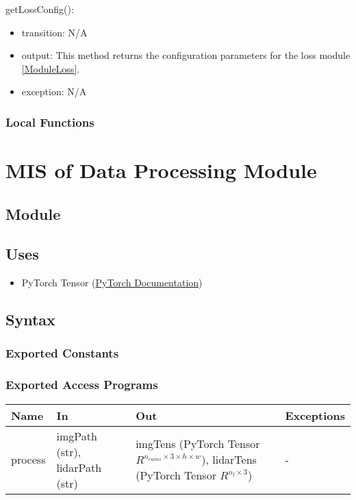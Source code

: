 \documentclass[12pt, titlepage]{article}
\begin{document}
\noindent getLossConfig():
\begin{itemize}
  \item transition: N/A
  \item output: This method returns the configuration parameters for the loss module \ref{ModuleLoss}.
  \item exception: N/A
\end{itemize}

\subsubsection{Local Functions}

\newpage

\section{MIS of Data Processing Module} \label{ModuleDataProc} 

\subsection{Module}



\subsection{Uses}
\begin{itemize}
  \item PyTorch Tensor (\href{https://pytorch.org/docs/stable/tensors.html}{PyTorch Documentation})
\end{itemize}

\subsection{Syntax}



\subsubsection{Exported Constants}



\subsubsection{Exported Access Programs}

\begin{center}
\begin{tabular}{p{2cm}|p{5cm}|p{3cm}|p{2cm}}
\hline
\textbf{Name} & \textbf{In} & \textbf{Out} & \textbf{Exceptions} \\
\hline
process & imgPath (str), lidarPath (str) & imgTens (PyTorch Tensor $R^{n_{cams}\times{}3\times{}h\times{}w}$), lidarTens (PyTorch Tensor $R^{n_{l}\times{}3}$) & - \\
\hline
\end{tabular}
\end{center}
\end{document}
